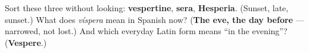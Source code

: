 \begin{tcolorbox}[breakable,colback=teal!4,colframe=teal!35!black,title={Before you move on}]
Sort these three without looking: \textbf{vespertine}, \textbf{sera}, \textbf{Hesperia}. (Sunset, late, sunset.) What does \emph{víspera} mean in Spanish now? (\textbf{The eve, the day before} — narrowed, not lost.) And which everyday Latin form means \textquotedblleft{}in the evening\textquotedblright{}? (\textbf{Vespere}.)
\end{tcolorbox}
